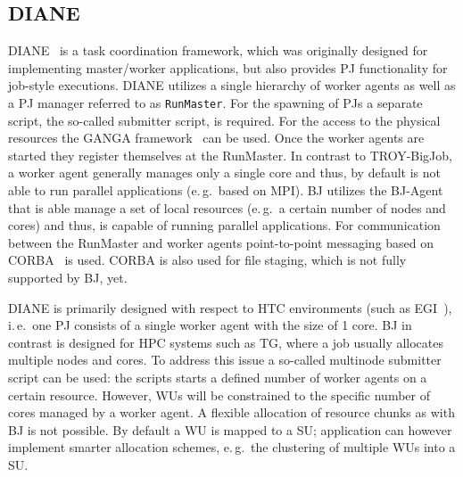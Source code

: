 \documentclass{sig-alternate}
\begin{document}

\subsection{DIANE}
DIANE~\cite{Moscicki:908910} is a task coordination framework, which
was originally designed for implementing master/worker applications,
but also provides PJ functionality for job-style executions. DIANE
utilizes a single hierarchy of worker agents as well as a PJ manager
referred to as \texttt{RunMaster}.
For the spawning of PJs a separate script, the so-called submitter script, is
required. For the access to the physical resources the GANGA
framework~\cite{Moscicki20092303} can be used.
Once the worker agents are started they register themselves at the RunMaster.
In contrast to TROY-BigJob, a worker agent generally manages only a single
core and thus, by default is not able to run parallel applications (e.\,g.\
based on MPI). BJ utilizes the BJ-Agent that is able manage a set of local
resources (e.\,g.\ a certain number of nodes and cores) and thus, is capable
of running parallel applications. For communication between the RunMaster and
worker agents point-to-point messaging based on CORBA~\cite{OMG-CORBA303:2004}
is used. CORBA is also used for file staging, which is not fully supported by
BJ, yet.

DIANE is primarily designed with respect to HTC environments (such as
EGI~\cite{egi}), i.\,e.\ one PJ consists of a single worker agent with the
size of 1 core. BJ in contrast is designed for HPC systems such as TG,
where a job usually allocates multiple nodes and cores. To address this issue
a so-called multinode submitter script can be used: the scripts starts a
defined number of worker agents on a certain resource. However, WUs will be
constrained to the specific number of cores managed by a worker agent. A
flexible allocation of resource chunks as with BJ is not possible. By
default a WU is mapped to a SU; application can however implement smarter
allocation schemes, e.\,g.\ the clustering of multiple WUs into a SU.
\end{document}
